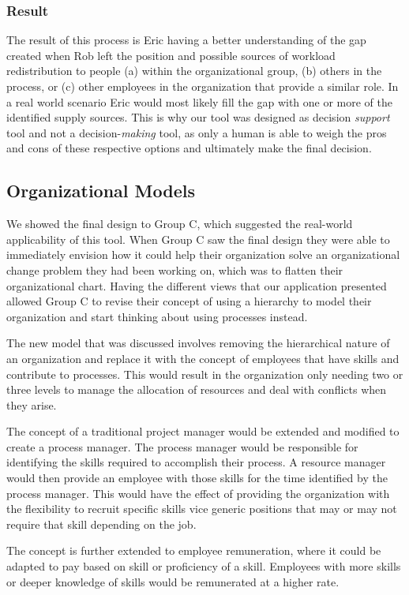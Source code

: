 \documentclass[journal]{vgtc}                %
\begin{document}
\subsubsection{Result}
The result of this process is Eric having a better understanding of the gap created when Rob left the position and possible sources of workload redistribution to people (a) within the organizational group, (b) others in the process, or (c) other employees in the organization that provide a similar role.
In a real world scenario Eric would most likely fill the gap with one or more of the identified supply sources.  This is why our tool was designed as decision \emph{support} tool and not a decision-\emph{making} tool, as only a human is able to weigh the pros and cons of these respective options and ultimately make the final decision. 

\subsection{Organizational Models}
We showed the final design to Group C, which suggested the real-world applicability of this tool. When Group C saw the final design they were able to immediately envision how it could help their organization solve an organizational change problem they had been working on, which was to flatten their organizational chart. Having the different views that our application presented allowed Group C to revise their concept of using a hierarchy to model their organization and start thinking about using processes instead.

The new model that was discussed involves removing the hierarchical nature of an organization and replace it with the concept of employees that have skills and contribute to processes.  This would result in the organization only needing two or three levels to manage the allocation of resources and deal with conflicts when they arise.

The concept of a traditional project manager would be extended and modified to create a process manager.  The process manager would be responsible for identifying the skills required to accomplish their process.  A resource manager would then provide an employee with those skills for the time identified by the process manager.  This would have the effect of providing the organization with the flexibility to recruit specific skills vice generic positions that may or may not require that skill depending on the job.

The concept is further extended to employee remuneration, where it could be adapted to pay based on skill or proficiency of a skill. Employees with more skills or deeper knowledge of skills would be remunerated at a higher rate.
\end{document}
